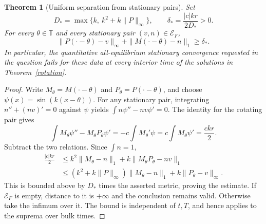 \documentclass[11pt]{article}
\newtheorem{theorem}{Theorem}
\newcommand{\T}{\mathbb T}
\begin{document}
\begin{theorem}[Uniform separation from stationary pairs]\label{separation}
Set
\[
 D_*=\max\{k,\ k^2+k\|P\|_\infty\},\qquad
 \delta_*=\frac{|c|kr}{2D_*}>0.
\]
For every $\theta\in\T$ and every stationary pair $(v,n)\in\mathcal E_F$,
\[
 \|P(\cdot-\theta)-v\|_\infty+\|M(\cdot-\theta)-n\|_1\ge\delta_*.
\]
In particular, the quantitative all-equilibrium stationary convergence requested in the question fails for these data at every interior time of the solutions in Theorem~\ref{rotation}.
\end{theorem}
\begin{proof}
Write $M_\theta=M(\cdot-\theta)$ and $P_\theta=P(\cdot-\theta)$, and choose $\psi(x)=\sin(k(x-\theta))$. For any stationary pair, integrating $n''+(nv)'=0$ against $\psi$ yields
$\int n\psi''-nv\psi'=0$. The identity for the rotating pair gives
\[
 \int M_\theta\psi''-M_\theta P_\theta\psi'
 =-c\int M_\theta'\psi=c\int M_\theta\psi'=\frac{ckr}{2}.
\]
Subtract the two relations. Since $\int n=1$,
\begin{align*}
 \frac{|c|kr}{2}
 &\le k^2\|M_\theta-n\|_1+k\|M_\theta P_\theta-nv\|_1\\
 &\le(k^2+k\|P\|_\infty)\|M_\theta-n\|_1+k\|P_\theta-v\|_\infty.
\end{align*}
This is bounded above by $D_*$ times the asserted metric, proving the estimate. If $\mathcal E_F$ is empty, distance to it is $+\infty$ and the conclusion remains valid. Otherwise take the infimum over it. The bound is independent of $t,T$, and hence applies to the suprema over bulk times.
\end{proof}
\end{document}
